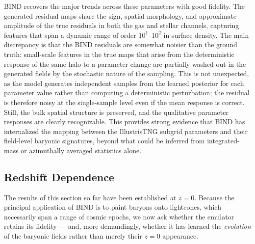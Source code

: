 \documentclass[linenumbers,trackchanges, twocolumn]{aastex701}
\begin{document}

\textsc{BIND} recovers the major trends across these parameters with good fidelity. The generated residual maps share the sign, spatial morphology, and approximate amplitude of the true residuals in both the gas and stellar channels, capturing features that span a dynamic range of order $10^{1}$--$10^{2}$ in surface density. The main discrepancy is that the \textsc{BIND} residuals are somewhat noisier than the ground truth: small-scale features in the true maps that arise from the deterministic response of the same halo to a parameter change are partially washed out in the generated fields by the stochastic nature of the sampling. This is not unexpected, as the model generates independent samples from the learned posterior for each parameter value rather than computing a deterministic perturbation; the residual is therefore noisy at the single-sample level even if the mean response is correct. Still, the bulk spatial structure is preserved, and the qualitative parameter responses are clearly recognizable. This provides strong evidence that \textsc{BIND} has internalized the mapping between the IllustrisTNG subgrid parameters and their field-level baryonic signatures, beyond what could be inferred from integrated-mass or azimuthally averaged statistics alone.



\subsection{Redshift Dependence}
\label{subsec:z_response}
The results of this section so far have been established at $z = 0$. Because the
principal application of \textsc{BIND} is to paint baryons onto lightcones, which
necessarily span a range of cosmic epochs, we now ask whether the emulator
retains its fidelity --- and, more demandingly, whether it has learned the
\emph{evolution} of the baryonic fields rather than merely their $z=0$
appearance.
\end{document}
